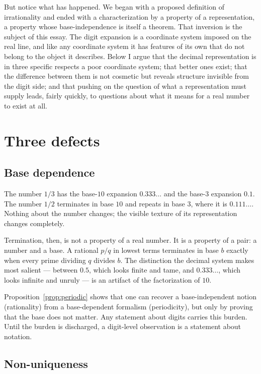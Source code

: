 \documentclass{essay}
\begin{document}
But notice what has happened. We began with a proposed definition of
irrationality and ended with a characterization by a property of a
representation, a property whose base-independence is itself a theorem. That
inversion is the subject of this essay. The digit expansion is a coordinate
system imposed on the real line, and like any coordinate system it has features
of its own that do not belong to the object it describes. Below I argue that
the decimal representation is in three specific respects a poor coordinate
system; that better ones exist; that the difference between them is not
cosmetic but reveals structure invisible from the digit side; and that pushing
on the question of what a representation must supply leads, fairly quickly, to
questions about what it means for a real number to exist at all.

\section{Three defects}

\subsection{Base dependence}

The number $1/3$ has the base-$10$ expansion $0.333\ldots$ and the base-$3$
expansion $0.1$. The number $1/2$ terminates in base $10$ and repeats in base
$3$, where it is $0.111\ldots$. Nothing about the number changes; the visible
texture of its representation changes completely.

Termination, then, is not a property of a real number. It is a property of a
pair: a number and a base. A rational $p/q$ in lowest terms terminates in base
$b$ exactly when every prime dividing $q$ divides $b$. The distinction the
decimal system makes most salient --- between $0.5$, which looks finite and
tame, and $0.333\ldots$, which looks infinite and unruly --- is an artifact of
the factorization of $10$.

Proposition~\ref{prop:periodic} shows that one can recover a base-independent
notion (rationality) from a base-dependent formalism (periodicity), but only by
proving that the base does not matter. Any statement about digits carries this
burden. Until the burden is discharged, a digit-level observation is a
statement about notation.

\subsection{Non-uniqueness}
\end{document}
